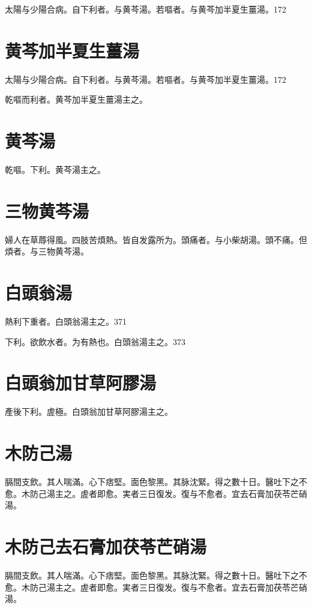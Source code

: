 \documentclass[b5paper,twoside,zihao=-4,UTF8]{ctexbook}
\begin{document}
太陽与少陽合病。自下利者。与黄芩湯。若嘔者。与黄芩加半夏生薑湯。172

\section{黄芩加半夏生薑湯}

太陽与少陽合病。自下利者。与黄芩湯。若嘔者。与黄芩加半夏生薑湯。172

乾嘔而利者。黄芩加半夏生薑湯主之。

\section{黄芩湯}

乾嘔。下利。黄芩湯主之。

\section{三物黄芩湯}

婦人在草蓐得風。四肢苦煩熱。皆自发露所为。頭痛者。与小柴胡湯。頭不痛。但煩者。与三物黄芩湯。

\section{白頭翁湯}

熱利下重者。白頭翁湯主之。371

下利。欲飲水者。为有熱也。白頭翁湯主之。373

\section{白頭翁加甘草阿膠湯}

產後下利。虗極。白頭翁加甘草阿膠湯主之。

\section{木防己湯}

膈間支飲。其人喘滿。心下痞堅。面色黎黑。其脉沈緊。得之數十日。醫吐下之不愈。木防己湯主之。虗者即愈。実者三日復发。復与不愈者。宜去石膏加茯苓芒硝湯。

\section{木防己去石膏加茯苓芒硝湯}

膈間支飲。其人喘滿。心下痞堅。面色黎黑。其脉沈緊。得之數十日。醫吐下之不愈。木防己湯主之。虗者即愈。実者三日復发。復与不愈者。宜去石膏加茯苓芒硝湯。
\end{document}
